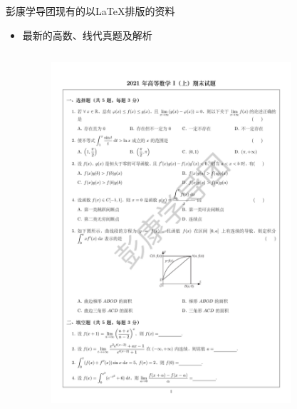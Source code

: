 \begin{frame}{彭康学导团现有的以\LaTeX 排版的资料}
    \begin{itemize}
        \item 最新的高数、线代真题及解析 
        \begin{columns}
            \begin{column}{0.48\textwidth}
                \begin{figure}
                    \centering
                    \includegraphics[scale=0.2]{figures/PK_GSZT.pdf}
                \end{figure}
            \end{column}
            \begin{column}{0.48\textwidth}
                \begin{figure}

\end{figure}
\end{column}
\end{columns}
\end{itemize}
\end{frame}
